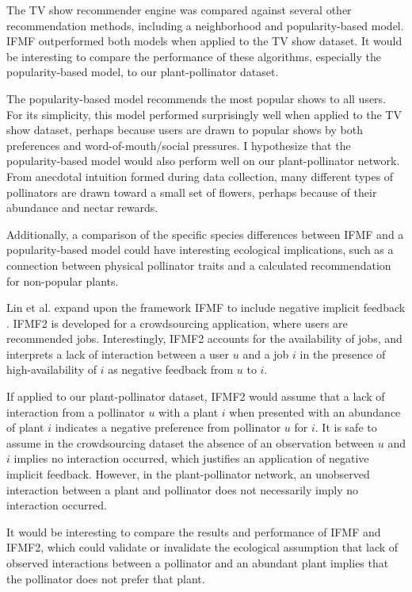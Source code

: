 \documentclass[twocolumn]{article}
\begin{document}
The TV show recommender engine was compared against several other
recommendation methods, including a neighborhood and popularity-based 
model. IFMF outperformed both models when applied to the TV show
dataset. It would be interesting to compare the performance of these
algorithms, especially the popularity-based model, to our 
plant-pollinator dataset. 

The popularity-based model recommends the most popular shows to 
all users. For its simplicity, this model performed surprisingly well 
when applied to the TV show dataset, perhaps because users are drawn
to popular shows by both preferences and word-of-mouth/social pressures.
I hypothesize that the popularity-based model would also perform well
on our plant-pollinator network. From anecdotal intuition formed during
data collection, many different types of pollinators are drawn toward 
a small set of flowers, perhaps because of their abundance and nectar
rewards.

Additionally, a comparison of the specific species differences between
IFMF and a popularity-based model could have interesting ecological
implications, such as a connection between physical pollinator traits and
a calculated recommendation for non-popular plants. 

Lin et al. expand upon the framework IFMF to include negative implicit 
feedback \cite{lin2014signals}. IFMF2 is developed for a crowdsourcing
application, where users are recommended jobs. Interestingly, IFMF2 
accounts for the availability of jobs, and interprets a lack of
interaction between a user $u$ and a job $i$ in the presence of 
high-availability of $i$ as negative feedback from $u$ to $i$.

If applied to our plant-pollinator dataset, IFMF2 would assume that
a lack of interaction from a pollinator $u$ with a plant $i$ when 
presented with an abundance of plant $i$ indicates a negative preference
from pollinator $u$ for $i$. It is safe to assume in the crowdsourcing
dataset the absence of an observation between $u$ and $i$ implies 
no interaction occurred, which justifies an application of negative 
implicit feedback\cite{lin2014signals}. However, in the plant-pollinator
network, an 
unobserved interaction between a plant and pollinator does not 
necessarily imply no interaction occurred.

It would be interesting to compare the results and performance of
IFMF and IFMF2, which could validate or invalidate the ecological
assumption that lack of observed interactions between a pollinator and
an abundant plant implies that the pollinator does not prefer that plant.
\end{document}
